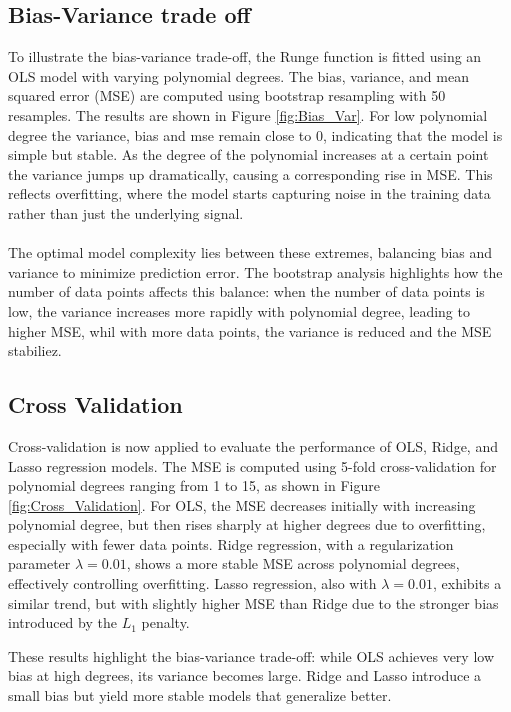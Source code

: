 \documentclass[
    article
 reprint,            %
 amsmath,amssymb,
 aps,
]{revtex4-2}
\begin{document}
\subsection{Bias-Variance trade off}
\label{Bias-Variance trade off}
To illustrate the bias-variance trade-off, the Runge function is fitted using an OLS model with varying polynomial degrees. 
The bias, variance, and mean squared error (MSE) are computed using bootstrap resampling with 50 resamples. The results are shown in Figure \ref{fig:Bias_Var}.
For low polynomial degree the variance, bias and mse remain close to 0, indicating that the model is simple but stable.
As the degree of the polynomial increases at a certain point the variance jumps up dramatically, causing a corresponding rise in MSE.
This reflects overfitting, where the model starts capturing noise in the training data rather than just the underlying signal.\\\\
The optimal model complexity lies between these extremes, balancing bias and variance to minimize prediction error.
The bootstrap analysis highlights how the number of data points affects this balance: when the number of data points is low, the variance increases more rapidly with polynomial degree, leading to higher MSE, whil with more data points, the variance is reduced and the MSE stabiliez.\\


\subsection{Cross Validation}
\label{Cross Validation}
Cross-validation is now applied to evaluate the performance of OLS, Ridge, and Lasso regression models.
The MSE is computed using 5-fold cross-validation for polynomial degrees ranging from 1 to 15, as shown in Figure \ref{fig:Cross_Validation}.
For OLS, the MSE decreases initially with increasing polynomial degree, but then rises sharply at higher degrees due to overfitting, especially with fewer data points.
Ridge regression, with a regularization parameter $\lambda = 0.01$, shows a more stable MSE across polynomial degrees, effectively controlling overfitting.
Lasso regression, also with $\lambda = 0.01$, exhibits a similar trend, but with slightly higher MSE than Ridge due to the stronger bias introduced by the $L_1$ penalty.       

These results highlight the bias-variance trade-off: while OLS achieves very low bias at high degrees, its variance becomes large.
Ridge and Lasso introduce a small bias but yield more stable models that generalize better.

\end{document}
